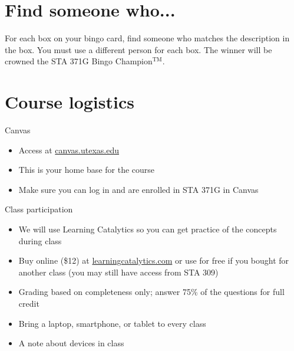 \documentclass{beamer}\usepackage[]{graphicx}\usepackage[]{color}
\begin{document}
\begin{darkframes}
    \section{Find someone who...}
    
    \begin{frame}{}
      \begin{center}
        For each box on your bingo card, find someone who matches the description in the box. You must use a different person for each box.
        \vfill
        The winner will be crowned the STA 371G Bingo Champion$^{\text{TM}}$.
      \end{center}
    \end{frame}

    \section{Course logistics}

    \begin{frame}{Canvas}
      \begin{itemize}
        \item Access at \url{canvas.utexas.edu}
        \item This is your home base for the course
        \item Make sure you can log in and are enrolled in STA 371G in Canvas
      \end{itemize}
    \end{frame}

    \begin{frame}{Class participation}
      \begin{itemize}
        \item We will use \alert{Learning Catalytics} so you can get practice of the concepts during class
        \item Buy online (\$12) at \url{learningcatalytics.com} or use for free if you bought for another class (you may still have access from STA 309)
        \item Grading based on completeness only; answer 75\% of the questions for full credit
        \item Bring a laptop, smartphone, or tablet to every class
        \item A note about devices in class
      \end{itemize}
    \end{frame}


\end{darkframes}
\end{document}
